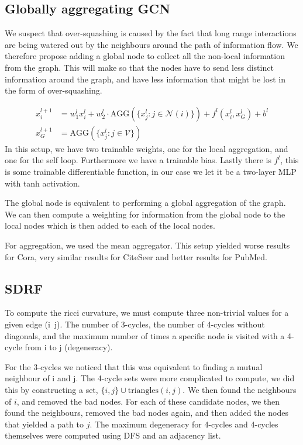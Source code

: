 \documentclass[a4paper,12pt]{article}
\begin{document}
\subsection{Globally aggregating GCN}
We suspect that over-squashing is caused by the fact that long range interactions are being 
watered out by the neighbours around the path of information flow. 
We therefore propose adding a global node to collect all the non-local information
from the graph. This will make so that the nodes have to send less distinct information
around the graph, and have less information that might be lost in the form of
over-squashing.

\begin{align}
  x^{l+1}_i &= w^l_1 x^l_i + w^l_2 \cdot \text{AGG}\left(\{x^l_j: j \in \mathcal{N}(i) \} \right) + f^l(x^l_i, x^l_G) + b^l\\
  x^{l+1}_G &= \text{AGG}\left(\{x^l_j: j \in \mathcal{V}\} \right)
\end{align}
In this setup, we have two trainable weights, one for the local aggregation, and one for the self loop. Furthermore we have a trainable bias. Lastly there is \(f^l\), this is some trainable differentiable function, in our case we let it be a two-layer MLP with tanh activation.

The global node is equivalent to performing a global aggregation of the graph.
We can then compute a weighting for information from the global node to the local nodes which
is then added to each of the local nodes.

For aggregation, we used the mean aggregator. This setup yielded worse results for Cora,
very similar results for CiteSeer and better results for PubMed.

\subsection{SDRF}
To compute the ricci curvature, we must compute three non-trivial values for a given edge (i~j). The number of 3-cycles, the number of 4-cycles without diagonals, and the maximum number of times a specific node is visited with a 4-cycle from i to j (degeneracy).

For the 3-cycles we noticed that this was equivalent to finding a mutual neighbour of i and j.
The 4-cycle sets were more complicated to compute, we did this by constructing a set, \(\{i, j\} \cup \text{triangles}(i, j)\). We then found the neighbours of \(i\), and removed the bad nodes.
For each of these candidate nodes, we then found the neighbours, removed the bad nodes again, and then added the nodes that yielded a path to \(j\).
The maximum degeneracy for 4-cycles and 4-cycles themselves were computed using DFS and an adjacency list.
\end{document}
